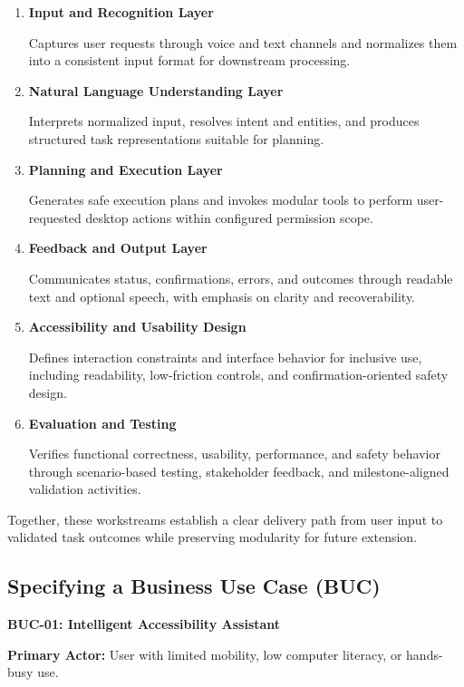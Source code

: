\documentclass[12pt]{article}
\begin{document}
\begin{enumerate}
  \item \textbf{Input and Recognition Layer}

  Captures user requests through voice and text channels and normalizes
  them into a consistent input format for downstream processing.

  \item \textbf{Natural Language Understanding Layer}

  Interprets normalized input, resolves intent and entities, and
  produces structured task representations suitable for planning.

  \item \textbf{Planning and Execution Layer}

  Generates safe execution plans and invokes modular tools to perform
  user-requested desktop actions within configured permission scope.

  \item \textbf{Feedback and Output Layer}

  Communicates status, confirmations, errors, and outcomes through
  readable text and optional speech, with emphasis on clarity and
  recoverability.

  \item \textbf{Accessibility and Usability Design}

  Defines interaction constraints and interface behavior for inclusive
  use, including readability, low-friction controls, and
  confirmation-oriented safety design.

  \item \textbf{Evaluation and Testing}

  Verifies functional correctness, usability, performance, and safety
  behavior through scenario-based testing, stakeholder feedback, and
  milestone-aligned validation activities.
\end{enumerate}

Together, these workstreams establish a clear delivery path from user
input to validated task outcomes while preserving modularity for future
extension.

\subsection{Specifying a Business Use Case (BUC)}
\textbf{BUC-01: Intelligent Accessibility Assistant}

\noindent\textbf{Primary Actor:}
User with limited mobility, low computer literacy, or hands-busy use.
\end{document}

